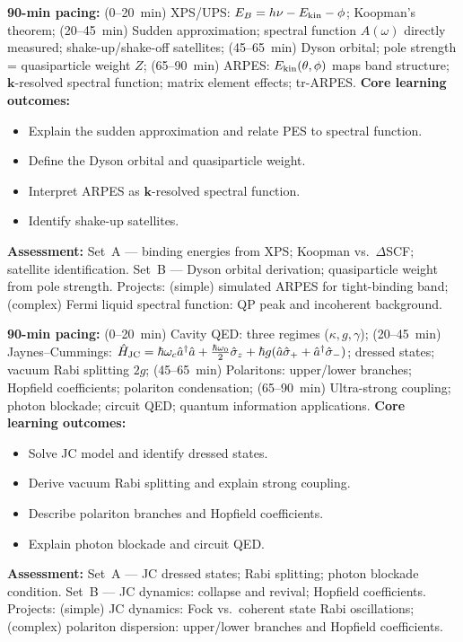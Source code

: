 \documentclass[11pt,a4paper]{article}
\begin{document}
\medskip

\begin{tcolorbox}[modulebox, title={Module~II.6 / L11: Photoelectron Spectroscopy}]
\textbf{90-min pacing:} (0--20~min) XPS/UPS: $E_B=h\nu-E_{\rm kin}-\phi$; Koopman's theorem; (20--45~min) Sudden approximation; spectral function $A(\omega)$ directly measured; shake-up/shake-off satellites; (45--65~min) Dyson orbital; pole strength = quasiparticle weight $Z$; (65--90~min) ARPES: $E_{\rm kin}(\theta,\phi)$ maps band structure; $\mathbf{k}$-resolved spectral function; matrix element effects; tr-ARPES.
\medskip\textbf{Core learning outcomes:}
\begin{itemize}[leftmargin=1.4em,topsep=2pt,itemsep=1pt]
  \item Explain the sudden approximation and relate PES to spectral function.
  \item Define the Dyson orbital and quasiparticle weight.
  \item Interpret ARPES as $\mathbf{k}$-resolved spectral function.
  \item Identify shake-up satellites.
\end{itemize}
\medskip\textbf{Assessment:}
Set~A --- binding energies from XPS; Koopman vs.\ $\Delta$SCF; satellite identification.
Set~B --- Dyson orbital derivation; quasiparticle weight from pole strength.
Projects: (simple) simulated ARPES for tight-binding band; (complex) Fermi liquid spectral function: QP peak and incoherent background.
\end{tcolorbox}

\medskip

\begin{tcolorbox}[modulebox, title={Module~II.6 / L12: Cavity QED and Strong Light--Matter Coupling}]
\textbf{90-min pacing:} (0--20~min) Cavity QED: three regimes ($\kappa,g,\gamma$); (20--45~min) Jaynes--Cummings: $\hat{H}_{\rm JC}=\hbar\omega_c\hat{a}^\dagger\hat{a}+\tfrac{\hbar\omega_0}{2}\hat\sigma_z+\hbar g(\hat{a}\hat\sigma_++\hat{a}^\dagger\hat\sigma_-)$; dressed states; vacuum Rabi splitting $2g$; (45--65~min) Polaritons: upper/lower branches; Hopfield coefficients; polariton condensation; (65--90~min) Ultra-strong coupling; photon blockade; circuit QED; quantum information applications.
\medskip\textbf{Core learning outcomes:}
\begin{itemize}[leftmargin=1.4em,topsep=2pt,itemsep=1pt]
  \item Solve JC model and identify dressed states.
  \item Derive vacuum Rabi splitting and explain strong coupling.
  \item Describe polariton branches and Hopfield coefficients.
  \item Explain photon blockade and circuit QED.
\end{itemize}
\medskip\textbf{Assessment:}
Set~A --- JC dressed states; Rabi splitting; photon blockade condition.
Set~B --- JC dynamics: collapse and revival; Hopfield coefficients.
Projects: (simple) JC dynamics: Fock vs.\ coherent state Rabi oscillations; (complex) polariton dispersion: upper/lower branches and Hopfield coefficients.
\end{tcolorbox}
\end{document}
